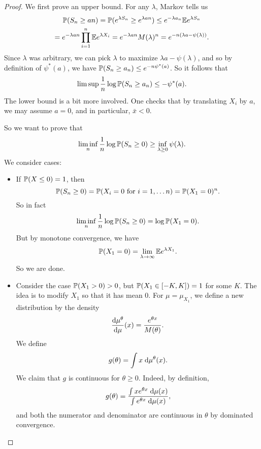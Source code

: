 \documentclass[a4paper]{article}
\begin{document}
\begin{proof}
  We first prove an upper bound. For any $\lambda$, Markov tells us
  \begin{multline*}
    \P(S_n \geq an) = \P(e^{\lambda S_n} \geq e ^{\lambda an}) \leq e^{-\lambda a_n} \E e^{\lambda S_n}\\
    = e^{-\lambda an} \prod_{i = 1}^n \E e^{\lambda X_i} = e^{-\lambda a n} M(\lambda)^n = e^{-n (\lambda a - \psi(\lambda))}.
  \end{multline*}
  Since $\lambda$ was arbitrary, we can pick $\lambda$ to maximize $\lambda a - \psi(\lambda)$, and so by definition of $\psi^*(a)$, we have $\P(S_n \geq a_n) \leq e^{-n \psi^*(a)}$. So it follows that
  \[
    \limsup \frac{1}{n} \log \P(S_n \geq a_n) \leq - \psi^*(a).
  \]
  The lower bound is a bit more involved. One checks that by translating $X_i$ by $a$, we may assume $a = 0$, and in particular, $\bar{x} < 0$.

  So we want to prove that
  \[
    \liminf_n \frac{1}{n} \log \P(S_n \geq 0) \geq \inf_{\lambda \geq 0} \psi(\lambda).
  \]
  We consider cases:
  \begin{itemize}
    \item If $\P(X \leq 0) = 1$, then
      \[
        \P(S_n \geq 0) = \P(X_i = 0\text{ for } i = 1, \ldots n) = \P(X_1 = 0)^n.
      \]
      So in fact
      \[
        \liminf_n \frac{1}{n} \log \P(S_n \geq 0) = \log \P(X_1 = 0).
      \]
      But by monotone convergence, we have
      \[
        \P(X_1 = 0) = \lim_{\lambda \to \infty} \E e^{\lambda X_1}.
      \]
      So we are done.
    \item Consider the case $\P(X_1 > 0) > 0$, but $\P(X_1 \in [-K, K]) = 1$ for some $K$. The idea is to modify $X_1$ so that it has mean $0$. For $\mu = \mu_{X_1}$, we define a new distribution by the density
      \[
        \frac{\d \mu^\theta}{\d \mu}(x) = \frac{e^{\theta x}}{M(\theta)}.
      \]
      We define
      \[
        g(\theta) = \int x\; \d \mu^\theta(x).
      \]
      We claim that $g$ is continuous for $\theta \geq 0$. Indeed, by definition,
      \[
        g(\theta) = \frac{\int x e^{\theta x}\;\d \mu(x)}{ \int e^{\theta x}\;\d \mu(x)},
      \]
      and both the numerator and denominator are continuous in $\theta$ by dominated convergence.


\end{itemize}
\end{proof}
\end{document}
